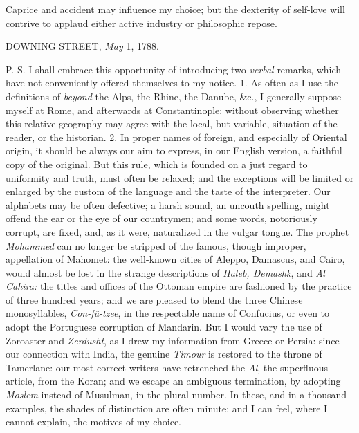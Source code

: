 Caprice and accident may influence my choice; but the dexterity of self-love
will contrive to applaud either active industry or philosophic repose.

DOWNING STREET, \textit{May} 1, 1788.

P. S. I shall embrace this opportunity of introducing two \textit{verbal}
remarks, which have not conveniently offered themselves to my notice. 1. As
often as I use the definitions of \textit{beyond} the Alps, the Rhine, the
Danube, \&c., I generally suppose myself at Rome, and afterwards at
Constantinople; without observing whether this relative geography may agree
with the local, but variable, situation of the reader, or the historian. 2. In
proper names of foreign, and especially of Oriental origin, it should be always
our aim to express, in our English version, a faithful copy of the original.
But this rule, which is founded on a just regard to uniformity and truth, must
often be relaxed; and the exceptions will be limited or enlarged by the custom
of the language and the taste of the interpreter. Our alphabets may be often
defective; a harsh sound, an uncouth spelling, might offend the ear or the
eye of our countrymen; and some words, notoriously corrupt, are fixed, and,
as it were, naturalized in the vulgar tongue. The prophet \textit{Mohammed}
can no longer be stripped of the famous, though improper, appellation of
Mahomet: the well-known cities of Aleppo, Damascus, and Cairo, would almost
be lost in the strange descriptions of \textit{Haleb, Demashk}, and \textit{Al
Cahira:} the titles and offices of the Ottoman empire are fashioned by the
practice of three hundred years; and we are pleased to blend the three Chinese
monosyllables, \textit{Con-fû-tzee}, in the respectable name of Confucius,
or even to adopt the Portuguese corruption of Mandarin. But I would vary the
use of Zoroaster and \textit{Zerdusht}, as I drew my information from Greece
or Persia: since our connection with India, the genuine \textit{Timour} is
restored to the throne of Tamerlane: our most correct writers have retrenched
the \textit{Al}, the superfluous article, from the Koran; and we escape an
ambiguous termination, by adopting \textit{Moslem} instead of Musulman, in
the plural number. In these, and in a thousand examples, the shades of
distinction are often minute; and I can feel, where I cannot explain, the
motives of my choice.

